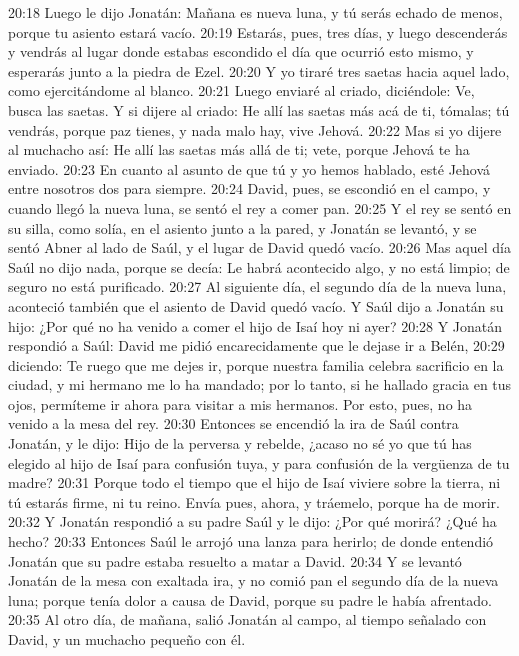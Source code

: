 20:18 Luego le dijo Jonatán: Mañana es nueva luna, y tú serás echado de menos, porque tu asiento estará vacío.  
20:19 Estarás, pues, tres días, y luego descenderás y vendrás al lugar donde estabas escondido el día que ocurrió esto mismo, y esperarás junto a la piedra de Ezel.  
20:20 Y yo tiraré tres saetas hacia aquel lado, como ejercitándome al blanco.  
20:21 Luego enviaré al criado, diciéndole: Ve, busca las saetas. Y si dijere al criado: He allí las saetas más acá de ti, tómalas; tú vendrás, porque paz tienes, y nada malo hay, vive Jehová.  
20:22 Mas si yo dijere al muchacho así: He allí las saetas más allá de ti; vete, porque Jehová te ha enviado.  
20:23 En cuanto al asunto de que tú y yo hemos hablado, esté Jehová entre nosotros dos para siempre.  
20:24 David, pues, se escondió en el campo, y cuando llegó la nueva luna, se sentó el rey a comer pan.  
20:25 Y el rey se sentó en su silla, como solía, en el asiento junto a la pared, y Jonatán se levantó, y se sentó Abner al lado de Saúl, y el lugar de David quedó vacío.  
20:26 Mas aquel día Saúl no dijo nada, porque se decía: Le habrá acontecido algo, y no está limpio; de seguro no está purificado.  
20:27 Al siguiente día, el segundo día de la nueva luna, aconteció también que el asiento de David quedó vacío. Y Saúl dijo a Jonatán su hijo: ¿Por qué no ha venido a comer el hijo de Isaí hoy ni ayer?  
20:28 Y Jonatán respondió a Saúl: David me pidió encarecidamente que le dejase ir a Belén,  
20:29 diciendo: Te ruego que me dejes ir, porque nuestra familia celebra sacrificio en la ciudad, y mi hermano me lo ha mandado; por lo tanto, si he hallado gracia en tus ojos, permíteme ir ahora para visitar a mis hermanos. Por esto, pues, no ha venido a la mesa del rey.  
20:30 Entonces se encendió la ira de Saúl contra Jonatán, y le dijo: Hijo de la perversa y rebelde, ¿acaso no sé yo que tú has elegido al hijo de Isaí para confusión tuya, y para confusión de la vergüenza de tu madre?  
20:31 Porque todo el tiempo que el hijo de Isaí viviere sobre la tierra, ni tú estarás firme, ni tu reino. Envía pues, ahora, y tráemelo, porque ha de morir.  
20:32 Y Jonatán respondió a su padre Saúl y le dijo: ¿Por qué morirá? ¿Qué ha hecho?  
20:33 Entonces Saúl le arrojó una lanza para herirlo; de donde entendió Jonatán que su padre estaba resuelto a matar a David.  
20:34 Y se levantó Jonatán de la mesa con exaltada ira, y no comió pan el segundo día de la nueva luna; porque tenía dolor a causa de David, porque su padre le había afrentado.  
20:35 Al otro día, de mañana, salió Jonatán al campo, al tiempo señalado con David, y un muchacho pequeño con él.  

